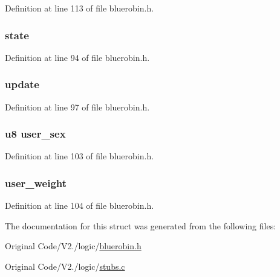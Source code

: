 \-Definition at line 113 of file bluerobin.\-h.

\hypertarget{structbr_a0929ffe8f07d1756ee75c71fb89d12bc}{
\subsubsection[{state}]{ {\bf state}}}\label{structbr_a0929ffe8f07d1756ee75c71fb89d12bc}


\-Definition at line 94 of file bluerobin.\-h.

\hypertarget{structbr_a8cc6727deeda7edbd8a611f7436081ea}{
\subsubsection[{update}]{ {\bf update}}}\label{structbr_a8cc6727deeda7edbd8a611f7436081ea}


\-Definition at line 97 of file bluerobin.\-h.

\hypertarget{structbr_a753dfdbb988f7a6c3cba1da48987c9ba}{
\subsubsection[{user\-\_\-sex}]{\setlength{\rightskip}{0pt plus 5cm}u8 {\bf user\-\_\-sex}}}\label{structbr_a753dfdbb988f7a6c3cba1da48987c9ba}


\-Definition at line 103 of file bluerobin.\-h.

\hypertarget{structbr_afbd1f6401c61aa55759c487e35ad9ff2}{
\subsubsection[{user\-\_\-weight}]{ {\bf user\-\_\-weight}}}\label{structbr_afbd1f6401c61aa55759c487e35ad9ff2}


\-Definition at line 104 of file bluerobin.\-h.



\-The documentation for this struct was generated from the following files\-:\begin{DoxyCompactItemize}
\item 
\-Original Code/\-V2./logic/\hyperlink{bluerobin_8h}{bluerobin.\-h}\item 
\-Original Code/\-V2./logic/\hyperlink{stubs_8c}{stubs.\-c}\end{DoxyCompactItemize}
